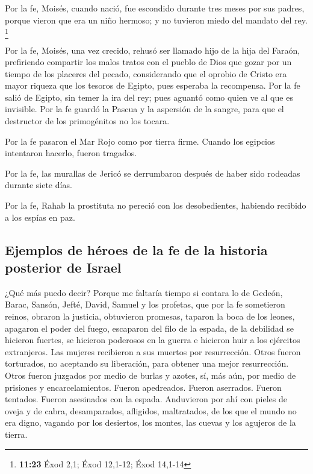 \begin{paracol}{2}
 Por la fe, Moisés, cuando nació, fue escondido durante
tres meses por sus padres, porque vieron que era un niño hermoso; y no
tuvieron miedo del mandato del rey. \footnote{\textbf{11:23} Éxod 2,1;
  Éxod 12,1-12; Éxod 14,1-14}

 Por la fe, Moisés, una vez crecido, rehusó ser llamado
hijo de la hija del Faraón,  prefiriendo compartir los
malos tratos con el pueblo de Dios que gozar por un tiempo de los
placeres del pecado,  considerando que el oprobio de
Cristo era mayor riqueza que los tesoros de Egipto, pues esperaba la
recompensa.  Por la fe salió de Egipto, sin temer la ira
del rey; pues aguantó como quien ve al que es invisible. 
Por la fe guardó la Pascua y la aspersión de la sangre, para que el
destructor de los primogénitos no los tocara.

 Por la fe pasaron el Mar Rojo como por tierra firme.
Cuando los egipcios intentaron hacerlo, fueron tragados.

 Por la fe, las murallas de Jericó se derrumbaron después
de haber sido rodeadas durante siete días.

 Por la fe, Rahab la prostituta no pereció con los
desobedientes, habiendo recibido a los espías en paz.

\hypertarget{ejemplos-de-huxe9roes-de-la-fe-de-la-historia-posterior-de-israel}{%
\subsection{Ejemplos de héroes de la fe de la historia posterior de
Israel}\label{ejemplos-de-huxe9roes-de-la-fe-de-la-historia-posterior-de-israel}}

 ¿Qué más puedo decir? Porque me faltaría tiempo si
contara lo de Gedeón, Barac, Sansón, Jefté, David, Samuel y los
profetas,  que por la fe sometieron reinos, obraron la
justicia, obtuvieron promesas, taparon la boca de los leones,
 apagaron el poder del fuego, escaparon del filo de la
espada, de la debilidad se hicieron fuertes, se hicieron poderosos en la
guerra e hicieron huir a los ejércitos extranjeros.  Las
mujeres recibieron a sus muertos por resurrección. Otros fueron
torturados, no aceptando su liberación, para obtener una mejor
resurrección.  Otros fueron juzgados por medio de burlas
y azotes, sí, más aún, por medio de prisiones y encarcelamientos.
 Fueron apedreados. Fueron aserrados. Fueron tentados.
Fueron asesinados con la espada. Anduvieron por ahí con pieles de oveja
y de cabra, desamparados, afligidos, maltratados,  de los
que el mundo no era digno, vagando por los desiertos, los montes, las
cuevas y los agujeros de la tierra.


\end{paracol}
